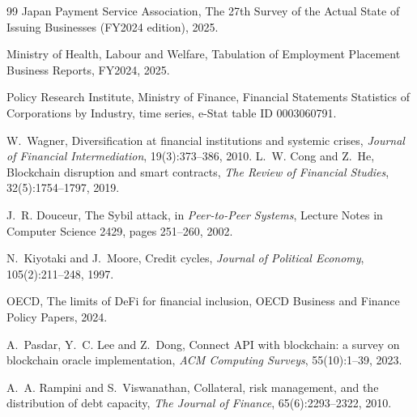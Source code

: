 \begin{thebibliography}{99}
Japan Payment Service Association,
\newblock The 27th Survey of the Actual State of Issuing Businesses (FY2024 edition), 2025.

Ministry of Health, Labour and Welfare,
\newblock Tabulation of Employment Placement Business Reports, FY2024, 2025.

Policy Research Institute, Ministry of Finance,
\newblock Financial Statements Statistics of Corporations by Industry, time series,
\newblock e-Stat table ID 0003060791.

W.~Wagner,
\newblock Diversification at financial institutions and systemic crises,
\newblock \emph{Journal of Financial Intermediation}, 19(3):373--386, 2010.
L.~W. Cong and Z.~He,
\newblock Blockchain disruption and smart contracts,
\newblock \emph{The Review of Financial Studies}, 32(5):1754--1797, 2019.

J.~R. Douceur,
\newblock The Sybil attack,
\newblock in \emph{Peer-to-Peer Systems}, Lecture Notes in Computer Science 2429, pages 251--260, 2002.

N.~Kiyotaki and J.~Moore,
\newblock Credit cycles,
\newblock \emph{Journal of Political Economy}, 105(2):211--248, 1997.

OECD,
\newblock The limits of DeFi for financial inclusion,
\newblock OECD Business and Finance Policy Papers, 2024.

A.~Pasdar, Y.~C. Lee and Z.~Dong,
\newblock Connect API with blockchain: a survey on blockchain oracle implementation,
\newblock \emph{ACM Computing Surveys}, 55(10):1--39, 2023.

A.~A. Rampini and S.~Viswanathan,
\newblock Collateral, risk management, and the distribution of debt capacity,
\newblock \emph{The Journal of Finance}, 65(6):2293--2322, 2010.


\end{thebibliography}
